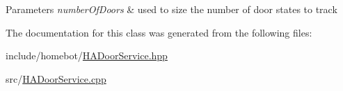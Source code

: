 \begin{DoxyParams}{Parameters}
{\em number\-Of\-Doors} & used to size the number of door states to track \\
\hline
\end{DoxyParams}


The documentation for this class was generated from the following files\-:\begin{DoxyCompactItemize}
\item 
include/homebot/\hyperlink{HADoorService_8hpp}{H\-A\-Door\-Service.\-hpp}\item 
src/\hyperlink{HADoorService_8cpp}{H\-A\-Door\-Service.\-cpp}\end{DoxyCompactItemize}
